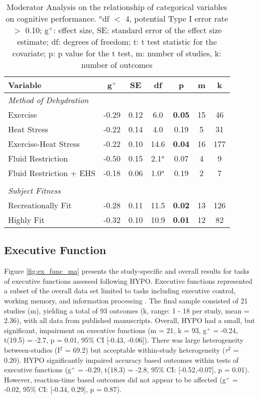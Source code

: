 \begin{table}
	\caption{Moderator Analysis on the relationship of categorical variables on cognitive performance. ${^a}$df ${<}$ 4, potential Type I error rate ${>}$ 0.10; g${^+}$: effect size, SE: standard error of the effect size estimate; df: degrees of freedom; t: t test statistic for the covariate; p: p value for the t test, m: number of studies, k: number of outcomes}
	\centering
	
	\begin{tabular}{lcccccc} 
		\hline
		\textbf{Variable} & \textbf{g${^+}$} & \textbf{SE} & \textbf{df} & \textbf{p} & \textbf{m} & 
		\textbf{k} \\
		\hline
		\textit{Method of Dehydration} &&&&&& \\
		Exercise & -0.29 & 0.12 & 6.0 & \textbf{0.05} & 15 & 46 \\
		Heat Stress & -0.22 & 0.14 & 4.0 & 0.19 & 5 & 31 \\
		Exercise-Heat Stress & -0.22 & 0.10 & 14.6 & \textbf{0.04} & 16 & 177 \\
		Fluid Restriction & -0.50 & 0.15 & 2.1${^a}$ & 0.07 & 4 & 9 \\
		Fluid Restriction + EHS	& -0.18 & 0.06 & 1.0${^a}$ & 0.19 & 2 & 7 \\
		&&&&&& \\
		\textit{Subject Fitness} &&&&&& \\
		Recreationally Fit & -0.28 & 0.11 & 11.5 & \textbf{0.02} & 13 & 126 \\
		Highly Fit &  -0.32 & 0.10 & 10.9 & \textbf{0.01} & 12 & 82 \\ 
		\hline	    
	\end{tabular}
	\label{tbl:moderators}
\end{table}

\subsection{Executive Function}
Figure \ref{fig:ex_func_ma} presents the study-specific and overall results for tasks of executive functions assessed following HYPO. Executive functions represented a subset of the overall data set limited to tasks including executive control, working memory, and information processing \cite{shields_does_2015}. The final sample consisted of 21 studies (m), yielding a total of 93 outcomes (k, range: 1 - 18 per study, mean = 2.36), with all data from published manuscripts. Overall, HYPO had a small, but significant, impairment on executive functions (m = 21, k = 93, g${^+}$ =  -0.24, t(19.5) = -2.7, p = 0.01, 95\% CI [-0.43, -0.06]). There was large heterogeneity between-studies (I${^2}$ = 69.2) but acceptable within-study heterogeneity (${\tau}$${^2}$ = 0.20). HYPO significantly impaired accuracy based outcomes within tests of executive functions (g${^+}$ = -0.29, t(18.3) = -2.8, 95\% CI: [-0.52,-0.07], p = 0.01). However, reaction-time based outcomes did not appear to be affected (g${^+}$ = -0.02, 95\% CI: [-0.34, 0.29], p = 0.87).

